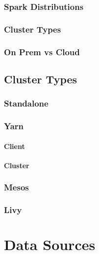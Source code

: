 \documentclass[]{book}
\theoremstyle{definition}
\theoremstyle{definition}
\theoremstyle{definition}
\theoremstyle{remark}
\begin{document}
\subsection{Spark Distributions}\label{spark-distributions}

\subsection{Cluster Types}\label{cluster-types}

\subsection{On Prem vs Cloud}\label{on-prem-vs-cloud}

\section{Cluster Types}\label{cluster-types-1}

\subsection{Standalone}\label{standalone}

\subsection{Yarn}\label{yarn}

\subsubsection{Client}\label{client}

\subsubsection{Cluster}\label{cluster}

\subsection{Mesos}\label{mesos}

\subsection{Livy}\label{livy}

\chapter{Data Sources}\label{data}
\end{document}
